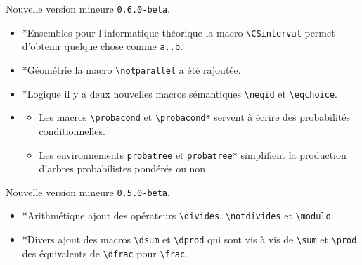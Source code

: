 \documentclass[12pt,a4paper]{book}
\makeatletter
\newcommand\env[1]{\texttt{#1}}
\newcommand\macro[1]{\env{\textbackslash{}#1}}
\theoremstyle{definition}
\newcommand\topic{\@ifstar{\@topic@star}{\@topic@no@star}}
\newcommand\@topic@no@star[1]{%
	\textbf{\textsc{#1}.}%
}
\newcommand\@topic@star[1]{%
	\textbf{\textsc{#1} :}%
}
\makeatother
\begin{document}
{{\begin{description}

    \medskip
    \item[2019-10-10] Nouvelle version mineure \verb+0.6.0-beta+.
    
    \begin{itemize}[itemsep=.5em]
        \item \topic*{Ensembles}
        	  pour l'informatique théorique la macro \macro{CSinterval} permet d'obtenir quelque chose comme \verb+a..b+.
    
    
    
    
        \item \topic*{Géométrie}
              la macro \macro{notparallel} a été rajoutée.
    
    
    
    
        \item \topic*{Logique}
              il y a deux nouvelles macros sémantiques \macro{neqid} et \macro{eqchoice}.
    
    
    
    
        \item \topic{Probabilités}
        \begin{itemize}[itemsep=.5em]
            \item Les macros \macro{probacond} et \macro{probacond*} servent à écrire des probabilités conditionnelles.
    
            \item Les environnements \verb+probatree+ et \verb+probatree*+ simplifient la production d'arbres probabilistes pondérés ou non.
        \end{itemize}
    \end{itemize}


    \medskip
    \item[2019-09-27] Nouvelle version mineure \verb+0.5.0-beta+.
    
    \begin{itemize}[itemsep=.5em]
        \item \topic*{Arithmétique}
              ajout des opérateurs \macro{divides}, \macro{notdivides} et \macro{modulo}.
    
    
    
    
        \item \topic*{Divers}
               ajout des macros \macro{dsum} et \macro{dprod} qui sont vis à vis de \macro{sum} et \macro{prod} des équivalents de \macro{dfrac} pour \macro{frac}.
    

\end{itemize}
\end{description}}}
\end{document}
